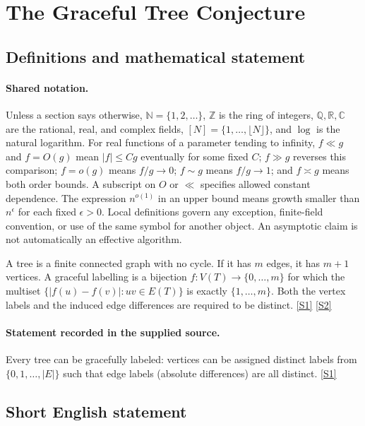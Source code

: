 \documentclass[11pt,a4paper]{article}
\newcommand{\N}{\mathbb{N}}
\newcommand{\Z}{\mathbb{Z}}
\newcommand{\Q}{\mathbb{Q}}
\newcommand{\R}{\mathbb{R}}
\newcommand{\C}{\mathbb{C}}
\newcommand{\sref}[2]{\hyperlink{source:#1:#2}{[S#2]}}
\begin{document}
\section{The Graceful Tree Conjecture}\label{statement}


\subsection{Definitions and mathematical statement}

\paragraph{Shared notation.}Unless a section says otherwise, $\N=\{1,2,\ldots\}$,
$\Z$ is the ring of integers, $\Q,\R,\C$ are the rational, real, and complex
fields, $[N]=\{1,\ldots,\lfloor N\rfloor\}$, and $\log$ is the natural
logarithm. For real functions of a parameter tending to infinity,
$f\ll g$ and $f=O(g)$ mean $|f|\leq Cg$ eventually for some fixed $C$;
$f\gg g$ reverses this comparison; $f=o(g)$ means $f/g\to0$;
$f\sim g$ means $f/g\to1$; and $f\asymp g$ means both order bounds.
A subscript on $O$ or $\ll$ specifies allowed constant dependence.
The expression $n^{o(1)}$ in an upper bound means growth smaller than
$n^\epsilon$ for each fixed $\epsilon>0$. Local definitions govern any
exception, finite-field convention, or use of the same symbol for another
object. An asymptotic claim is not automatically an effective algorithm.



A tree is a finite connected graph with no cycle. If it has $m$ edges, it has $m+1$ vertices. A graceful labelling is a bijection $f:V(T)\to\{0,\ldots,m\}$ for which the multiset $\{|f(u)-f(v)|:uv\in E(T)\}$ is exactly $\{1,\ldots,m\}$. Both the vertex labels and the induced edge differences are required to be distinct. \sref{statement}{1} \sref{statement}{2}

\paragraph{Statement recorded in the supplied source.}
Every tree can be gracefully labeled: vertices can be assigned distinct labels from $\{0, 1, \ldots, |E|\}$ such that edge labels (absolute differences) are all distinct. \sref{statement}{1}

\subsection{Short English statement}
\end{document}
